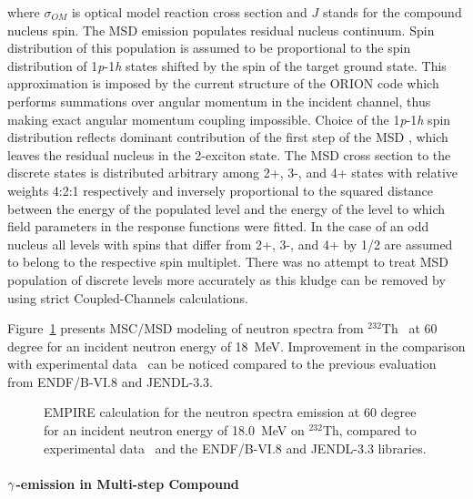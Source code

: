 \noindent where $\sigma_{OM}$ is optical model reaction cross section and $J$
stands for the compound nucleus spin. The MSD%
 emission populates residual nucleus continuum. Spin distribution
of this population is assumed to be proportional to the spin distribution of
1\emph{p}-1\emph{h} states shifted by the spin of the target ground state.
This approximation is imposed by the current structure of the ORION%
 code which performs summations over angular momentum in the
incident channel, thus making exact angular momentum coupling impossible.
Choice of the 1\emph{p}-1\emph{h} spin distribution reflects dominant
contribution of the first step of the MSD%
, which leaves the residual nucleus in the 2-exciton state. The
MSD%
 cross section to the discrete states is distributed arbitrary
among 2+, 3-, and 4+ states with relative weights 4:2:1 respectively and
inversely proportional to the squared distance between the energy of the
populated level and the energy of the level to which field parameters in the
response functions were fitted. In the case of an odd nucleus all levels
with spins that differ from 2+, 3-, and 4+ by 1/2 are assumed to belong to
the respective spin multiplet. There was no attempt to treat MSD%
 population of discrete levels more accurately as this kludge can
be removed by using strict Coupled-Channels calculations.

Figure~\ref{thoriumMSD} presents MSC/MSD modeling of neutron spectra from $%
^{232}$Th~\cite{crp} at 60 degree for an incident neutron energy of 18~MeV.
Improvement in the comparison with experimental data~\cite{mats} can be
noticed compared to the previous evaluation from ENDF/B-VI.8 and JENDL-3.3. 
\begin{figure}[htbp]
\caption{EMPIRE calculation for the neutron spectra emission at 60 degree
for an incident neutron energy of 18.0~MeV on $^{232}$Th, compared to
experimental data~\protect\cite{mats} and the ENDF/B-VI.8 and JENDL-3.3
libraries.}
\label{thoriumMSD}
\end{figure}

\medskip

\paragraph{$\protect\gamma$-emission in Multi-step Compound}

